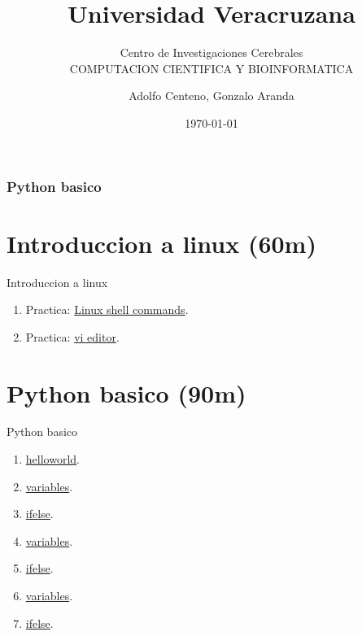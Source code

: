 \documentclass{beamer}
\begin{document}
\title{Universidad Veracruzana}  
\subtitle{Centro de Investigaciones Cerebrales\\COMPUTACION CIENTIFICA Y BIOINFORMATICA}
\author{Adolfo Centeno, Gonzalo Aranda}
\date{\today} 

\begin{frame}
\titlepage
\end{frame}

\begin{frame}\frametitle{Python basico}
\tableofcontents
\end{frame} 






\section{Introduccion a linux (60m) }

\begin{frame}


Introduccion a linux

\begin{enumerate}
\item
	 
	Practica: \href{https://github.com/adsoftsito/python/blob/master/w1/linuxcommands.pdf}{Linux shell commands}.
	
    
\item
	Practica: \href{https://github.com/adsoftsito/python/blob/master/w1/vi-editor.pdf}{vi editor}.

\end{enumerate} 


\end{frame}


\section{Python basico (90m) }

\begin{frame}


Python basico

\begin{enumerate}
\item
	 \href{https://github.com/adsoftsito/python/blob/master/w1/vi-editor.pdf}{helloworld}.
\item
	\href{https://github.com/adsoftsito/python/blob/master/w1/vi-editor.pdf}{variables}.
\item
	\href{https://github.com/adsoftsito/python/blob/master/w1/vi-editor.pdf}{ifelse}.
\item
	\href{https://github.com/adsoftsito/python/blob/master/w1/vi-editor.pdf}{variables}.
\item
	\href{https://github.com/adsoftsito/python/blob/master/w1/vi-editor.pdf}{ifelse}.
\item
	\href{https://github.com/adsoftsito/python/blob/master/w1/vi-editor.pdf}{variables}.
\item
	\href{https://github.com/adsoftsito/python/blob/master/w1/vi-editor.pdf}{ifelse}.
	
\end{enumerate} 


\end{frame}
\end{document}
